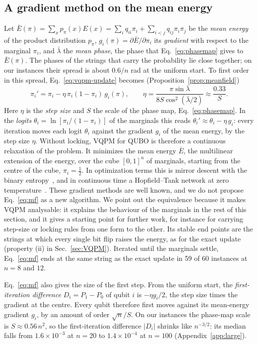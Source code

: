 \documentclass[onecolumn,10pt]{article}
\theoremstyle{remark}
\theoremstyle{plain}
\begin{document}
\subsection{A gradient method on the mean energy}
\label{sec:gradient}
Let $\bar E(\pi)=\sum_xp_\pi(x)E(x)=\sum_iq_{ii}\pi_i+\sum_{i<j}q_{ij}\pi_i\pi_j$ be the \emph{mean energy} of the product distribution $p_\pi$, $g_i(\pi)=\partial\bar E/\partial\pi_i$ its \emph{gradient} with respect to the marginal $\pi_i$, and $\bar\lambda$ the \emph{mean phase}, the phase that Eq.~\eqref{eq:phasemap} gives to $\bar E(\pi)$. The phases of the strings that carry the probability lie close together; on our instances their spread is about $0.6/n$ rad at the uniform start. To first order in this spread, Eq.~\eqref{eq:vqpm-update} becomes (Proposition~\ref{prop:meanfield})
\begin{equation}
\label{eq:mf}
\pi_i'=\pi_i-\eta\,\pi_i(1-\pi_i)\,g_i(\pi),\qquad \eta=\frac{\pi\sin\bar\lambda}{8S\cos^2(\bar\lambda/2)}\approx\frac{0.33}{S}.
\end{equation}
Here $\eta$ is the \emph{step size} and $S$ the scale of the phase map, Eq.~\eqref{eq:phasemap}. In the \emph{logits} $\theta_i=\ln[\pi_i/(1-\pi_i)]$ of the marginals this reads $\theta_i'\approx\theta_i-\eta\,g_i$: every iteration moves each logit $\theta_i$ against the gradient $g_i$ of the mean energy, by the step size $\eta$. Without locking, VQPM for QUBO is therefore a continuous relaxation of the problem. It minimizes the mean energy $\bar E$, the multilinear extension of the energy, over the cube $[0,1]^n$ of marginals, starting from the centre of the cube, $\pi_i=\frac12$. In optimization terms this is mirror descent with the binary entropy~\cite{beck2003mirror}, and in continuous time a Hopfield--Tank network at zero temperature~\cite{hopfield1985neural}. These gradient methods are well known, and we do not propose Eq.~\eqref{eq:mf} as a new algorithm. We point out the equivalence because it makes VQPM analysable: it explains the behaviour of the marginals in the rest of this section, and it gives a starting point for further work, for instance for carrying step-size or locking rules from one form to the other. Its stable end points are the strings at which every single bit flip raises the energy, as for the exact update (property (ii) in Sec.~\ref{sec:VQPM}). Iterated until the marginals settle, Eq.~\eqref{eq:mf} ends at the same string as the exact update in 59 of 60 instances at $n=8$ and $12$.

Eq.~\eqref{eq:mf} also gives the size of the first step. From the uniform start, the \emph{first-iteration difference} $D_i=P_1-P_0$ of qubit $i$ is $-\eta g_i/2$, the step size times the gradient at the centre. Every qubit therefore first moves against its mean-energy gradient $g_i$, by an amount of order $\sqrt n/S$. On our instances the phase-map scale is $S\approx0.56\,n^2$, so the first-iteration difference $|D_i|$ shrinks like $n^{-3/2}$: its median falls from $1.6\times10^{-3}$ at $n=20$ to $1.4\times10^{-4}$ at $n=100$ (Appendix~\ref{app:large}).
\end{document}
